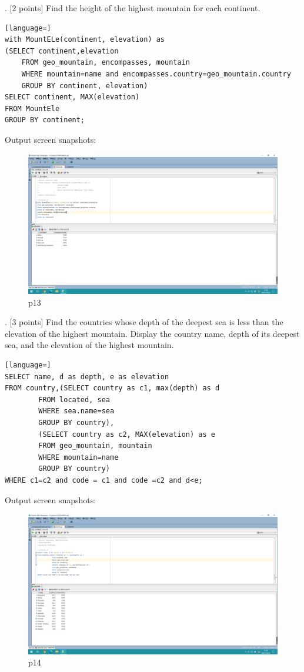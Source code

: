 \documentclass[]{article}
\begin{document}
	. [2 points] Find the height of the highest mountain for each continent.  \\
	
	\begin{lstlisting}[language=] 
with MountELe(continent, elevation) as 
(SELECT continent,elevation
	FROM geo_mountain, encompasses, mountain
	WHERE mountain=name and encompasses.country=geo_mountain.country
	GROUP BY continent, elevation)
SELECT continent, MAX(elevation)
FROM MountEle
GROUP BY continent;
	\end{lstlisting} 
	Output screen snapshots:
	\begin{figure}[H]
		\centering
		\includegraphics[width=0.85\linewidth]{../screen/p13}
		\caption{p13}
		\label{fig:p13}
	\end{figure}
	
	. [3 points] Find the countries whose depth of the deepest sea is less than the elevation of the highest mountain. Display the country name, depth of its deepest sea, and the elevation of the highest mountain. \\
	
	\begin{lstlisting}[language=] 
SELECT name, d as depth, e as elevation
FROM country,(SELECT country as c1, max(depth) as d
		FROM located, sea
		WHERE sea.name=sea
		GROUP BY country),
		(SELECT country as c2, MAX(elevation) as e
		FROM geo_mountain, mountain
		WHERE mountain=name
		GROUP BY country)
WHERE c1=c2 and code = c1 and code =c2 and d<e;
	\end{lstlisting} 
	Output screen snapshots:
	\begin{figure}[H]
		\centering
		\includegraphics[width=1\linewidth]{../screen/p14}
		\caption{p14}
		\label{fig:p14}
	\end{figure}
	
\end{document}
